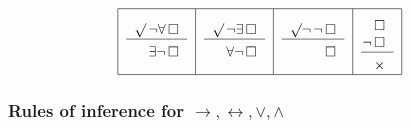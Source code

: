 \documentclass[letterpaper, 11pt]{article}
\theoremstyle{definition}
\begin{document}
\[\begin{tabular}{|c|c|c|c|}
\hline
\begin{tabular}{r}
$\surd\, \neg\forall\,\square$\\ \hline
$\rule{0pt}{12pt}\exists \neg\,\square$
\end{tabular}
&
\begin{tabular}{r}
$\surd\, \neg\exists\,\square$\\ \hline
$\rule{0pt}{12pt}\forall \neg\,\square$
\end{tabular}
&
\begin{tabular}{r}
$\surd \neg\,\neg\,\square$\\ \hline
$\rule{0pt}{12pt}\square$
\end{tabular}
&
\begin{tabular}{r}
\rule{0pt}{15pt}
$\square$\\
\hspace{-6pt}$\neg\, \square$\\ \hline
$\rule{0pt}{12pt}\times$
\end{tabular}\\\hline

\end{tabular}\]

\subsubsection{Rules of inference for $\mathbf \to, \leftrightarrow, \vee, \wedge$}
\end{document}
